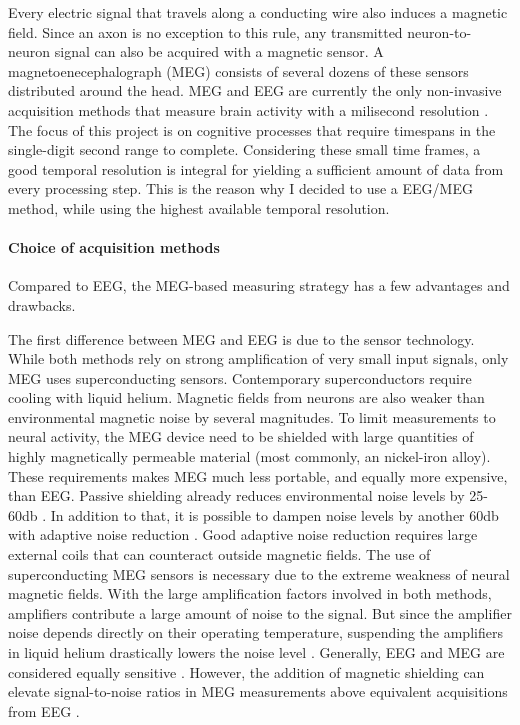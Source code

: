 Every electric signal that travels along a conducting wire also induces a magnetic field.
Since an axon is no exception to this rule, any transmitted neuron-to-neuron signal can also be acquired with a magnetic sensor.
A magnetoenecephalograph (MEG) consists of several dozens of these sensors distributed around the head.
MEG and EEG are currently the only non-invasive acquisition methods that measure brain activity with a milisecond resolution \cite{1.5.MEG.a}\cite{1.5.MEG.b}\cite{1.5.MEG.c}.
The focus of this project is on cognitive processes that require timespans in the single-digit second range to complete.
Considering these small time frames, a good temporal resolution is integral for yielding a sufficient amount of data from every processing step.
This is the reason why I decided to use a EEG/MEG method, while using the highest available temporal resolution.

\paragraph{Choice of acquisition methods}
Compared to EEG, the MEG-based measuring strategy has a few advantages and drawbacks.

The first difference between MEG and EEG is due to the sensor technology.
While both methods rely on strong amplification of very small input signals, only MEG uses superconducting sensors.
Contemporary superconductors require cooling with liquid helium.
Magnetic fields from neurons are also weaker than environmental magnetic noise by several magnitudes.
To limit measurements to neural activity, the MEG device need to be shielded with large quantities of highly magnetically permeable material (most commonly, an nickel-iron alloy).
These requirements makes MEG much less portable, and equally more expensive, than EEG.
Passive shielding already reduces environmental noise levels by 25-60db \cite{1.5.SNR}.
In addition to that, it is possible to dampen noise levels by another 60db with adaptive noise reduction \cite{1.5.SNR}.
Good adaptive noise reduction requires large external coils that can counteract outside magnetic fields.
The use of superconducting MEG sensors is necessary due to the extreme weakness of neural magnetic fields.
With the large amplification factors involved in both methods, amplifiers contribute a large amount of noise to the signal.
But since the amplifier noise depends directly on their operating temperature, suspending the amplifiers in liquid helium drastically lowers the noise level \cite{1.5.MEG.a}.
Generally, EEG and MEG are considered equally sensitive \cite{1.5.MEG.a}\cite{1.5.MEG.c}.
However, the addition of magnetic shielding can elevate signal-to-noise ratios in MEG measurements above equivalent acquisitions from EEG \cite{1.5.SNR}.

